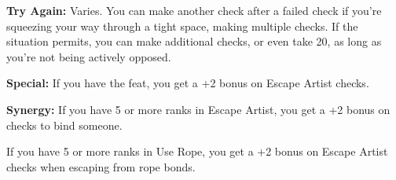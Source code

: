 \textbf{Try Again:} Varies. You can make another check after a failed check if 
you're squeezing your way through a tight space, making multiple checks. If the 
situation permits, you can make additional checks, or even take 20, as long as 
you're not being actively opposed.

\textbf{Special:} If you have the  feat, you get a +2 bonus on Escape Artist 
checks.

\textbf{Synergy:} If you have 5 or more ranks in Escape Artist, you get a +2 bonus 
on  checks to bind someone.

If you have 5 or more ranks in Use Rope, you get a +2 bonus on Escape Artist checks 
when escaping from rope bonds.
